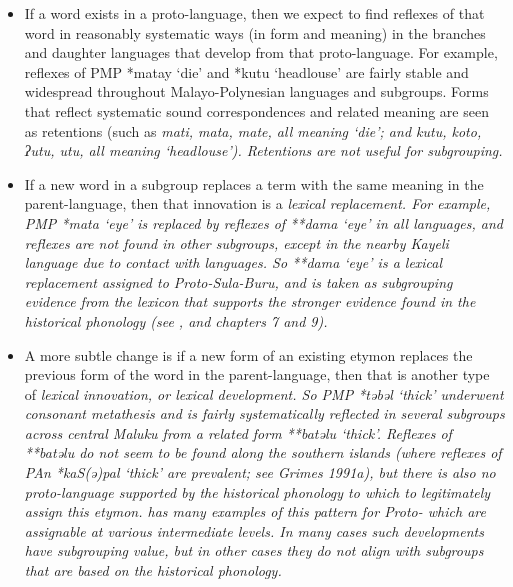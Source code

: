 \begin{itemize}
	\item	If a word exists in a proto-language,
				then we expect to find reflexes of that word in reasonably systematic
				ways (in form and meaning) in the branches
				and daughter languages that develop from that proto-language.
				For example, reflexes of PMP *matay ‘die’
				and *kutu ‘headlouse’ are fairly stable
				and widespread throughout Malayo-Polynesian languages and subgroups.
				Forms that reflect systematic sound correspondences
				and related meaning are seen as retentions (such as \it{mati,
				mata, mate}, all meaning ‘die’; and \it{kutu,
				koto, ʔutu, utu}, all meaning ‘headlouse’).
				Retentions are not useful for subgrouping.

	\item	If a new word in a subgroup replaces a term with the same meaning
				in the parent-language, then that innovation is a \it{lexical replacement}.
				For example, PMP *mata ‘eye’ is replaced by reflexes of **dama
				‘eye’ in all  languages,
				and reflexes are not found in other subgroups,
				except in the nearby Kayeli language due to contact with  languages.
				So **dama ‘eye’ is a lexical replacement assigned to Proto-Sula-Buru,
				and is taken as subgrouping evidence from the lexicon that supports
				the stronger evidence found in the historical phonology (see
				, and chapters 7 and 9).

	\item	A more subtle change is if a new form of an existing etymon
				replaces the previous form of the word in the parent-language,
				then that is another type of \it{lexical innovation}, or lexical development.
				So PMP *təbəl ‘thick’ underwent consonant metathesis
				and is fairly systematically reflected in several subgroups across
				central Maluku from a related form **batəlu ‘thick’.
				Reflexes of **batəlu do not seem to be found along the southern
				islands (where reflexes of PAn *kaS(ə)pal ‘thick’ are prevalent;
				see Grimes 1991a), but there is also no proto-language supported by the historical
				phonology to which to legitimately assign this etymon.
				\citet{Edwards2021} has many examples of this pattern for Proto-
				which are assignable at various intermediate levels.
				In many cases such developments have subgrouping value,
				but in other cases they do not align with subgroups that are
				based on the historical phonology.


\end{itemize}
